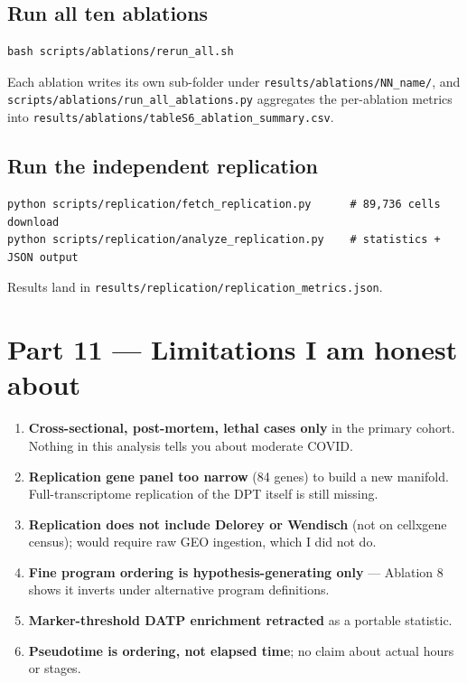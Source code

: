 \documentclass[11pt]{article}
\begin{document}
\subsection{Run all ten ablations}

\begin{verbatim}
bash scripts/ablations/rerun_all.sh
\end{verbatim}

Each ablation writes its own sub-folder under \texttt{results/ablations/NN\_name/},
and \texttt{scripts/ablations/run\_all\_ablations.py} aggregates
the per-ablation metrics into
\texttt{results/ablations/tableS6\_ablation\_summary.csv}.

\subsection{Run the independent replication}

\begin{verbatim}
python scripts/replication/fetch_replication.py      # 89,736 cells download
python scripts/replication/analyze_replication.py    # statistics + JSON output
\end{verbatim}

Results land in \texttt{results/replication/replication\_metrics.json}.

\section{Part 11 --- Limitations I am honest about}

\begin{enumerate}
\item \textbf{Cross-sectional, post-mortem, lethal cases only} in the primary
      cohort. Nothing in this analysis tells you about moderate COVID.
\item \textbf{Replication gene panel too narrow} (84 genes) to build a new
      manifold. Full-transcriptome replication of the DPT itself is still
      missing.
\item \textbf{Replication does not include Delorey or Wendisch} (not on
      cellxgene census); would require raw GEO ingestion, which I did not do.
\item \textbf{Fine program ordering is hypothesis-generating only} ---
      Ablation 8 shows it inverts under alternative program definitions.
\item \textbf{Marker-threshold DATP enrichment retracted} as a portable
      statistic.
\item \textbf{Pseudotime is ordering, not elapsed time}; no claim about
      actual hours or stages.
\end{enumerate}
\end{document}
